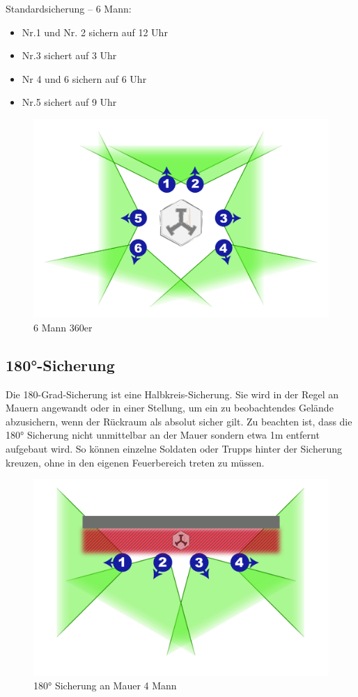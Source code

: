 	Standardsicherung – 6 Mann: 
		\begin{itemize}
			\item Nr.1 und Nr. 2 sichern auf 12 Uhr 
			\item Nr.3 sichert auf 3 Uhr 
			\item Nr 4 und 6 sichern auf 6 Uhr
			\item Nr.5 sichert auf 9 Uhr
		\end{itemize}
		\begin{figure}[htbp]
			\centering
			\includegraphics[width=0.8\linewidth]{./img/grundlagen/sicherungen/360grad_sicherung_6mann.jpg}	
			\caption{6 Mann 360er}
		\end{figure}
		

\subsection{180°-Sicherung}
	Die 180-Grad-Sicherung ist eine Halbkreis-Sicherung. Sie wird in der Regel an Mauern angewandt oder in einer Stellung, um ein zu beobachtendes Gelände abzusichern, wenn der Rückraum als absolut sicher gilt. Zu beachten ist, dass die 180° Sicherung nicht unmittelbar an der Mauer sondern etwa 1m entfernt aufgebaut wird. So können einzelne Soldaten oder Trupps hinter der Sicherung kreuzen, ohne in den eigenen Feuerbereich treten zu müssen. \\
	\begin{figure}[htbp]
		\centering
		\includegraphics[width=0.8\linewidth]{./img/grundlagen/sicherungen/180grad_sicherung_4mann.jpg}
		\caption{180° Sicherung an Mauer 4 Mann}
		\end{figure}
		
